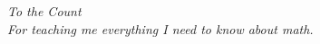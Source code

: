 \documentclass[\main/thesis.tex]{subfiles}
\begin{document}
\begin{dedication}
	\vspace*{1in}
	\begin{center}
	         \emph{To the Count} \\
             \emph{For teaching me everything I need to know about math.}
	\end{center}
\end{dedication}
\end{document}
